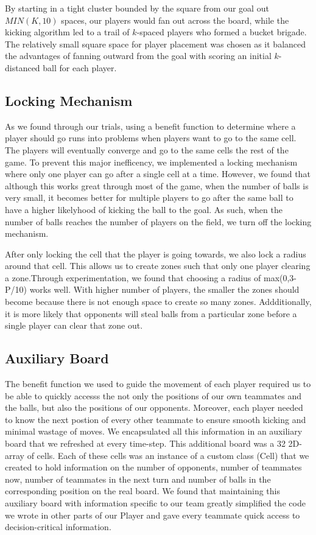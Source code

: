 \documentclass[
10pt, %
letterpaper, %
oneside, %
headinclude,footinclude, %
english
]{article}
\begin{document}
By starting in a tight cluster bounded by the square from our goal out $MIN(K,10)$ spaces, our players would fan out across the board, while the kicking algorithm led to a trail of $k$-spaced players who formed a bucket brigade. The relatively small square space for player placement was chosen as it balanced the advantages of fanning outward from the goal with scoring an initial $k$-distanced ball for each player.

\subsection{Locking Mechanism}
As we found through our trials, using a benefit function to determine where a player should go runs into problems when players want to go to the same cell. The players will eventually converge and go to the same cells the rest of the game. To prevent this major inefficency, we implemented a locking mechanism where only one player can go after a single cell at a time. However, we found that although this works great through most of the game, when the number of balls is very small, it becomes better for multiple players to go after the same ball to have a higher likelyhood of kicking the ball to the goal. As such, when the number of balls reaches the number of players on the field, we turn off the locking mechanism.

After only locking the cell that the player is going towards, we also lock a radius around that cell. This allows us to create zones such that only one player clearing a zone.Through experimentation, we found that choosing a radius of max(0,3-P/10) works well. With higher number of players, the smaller the zones should become because there is not enough space to create so many zones. Addditionally, it is more likely that opponents will steal balls from a particular zone before a single player can clear that zone out.

\subsection {Auxiliary Board}
The benefit function we used to guide the movement of each player required us to be able to quickly accesss the not only the positions of our own teammates and the balls, but also the positions of our opponents. Moreover, each player needed to know the next postion of every other teammate to ensure smooth kicking and minimal wastage of moves. We encapsulated all this information in an auxiliary board that we refreshed at every time-step. This additional board was a 32  2D-array of cells. Each of these cells was an instance of a custom class (Cell) that we created to hold information on the number of opponents, number of teammates now, number of teammates in the next turn and number of balls in the corresponding position on the real board. We found that maintaining this auxiliary board with information specific to our team greatly simplified the code we wrote in other parts of our Player and gave every teammate quick access to decision-critical information. 
\end{document}
